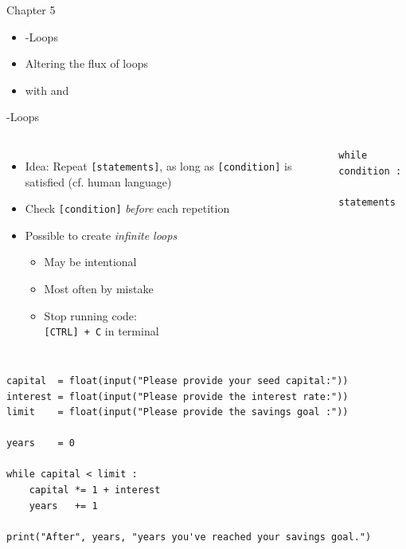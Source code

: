 
\begin{frame}[fragile]{Chapter 5}
%
\begin{itemize}
\item {}-Loops
\item Altering the flux of loops
\item {} with  and 
\end{itemize}
%
\end{frame}


\begin{frame}[fragile]{-Loops}
%
\begin{columns}[T]
\begin{itemize}
\item Idea: Repeat \texttt{[statements]}, as long as \texttt{[condition]} is satisfied (cf. human language)
\item Check \texttt{[condition]} \emph{before} each repetition
\item Possible to create \emph{infinite loops}
	\begin{itemize}
	\item May be intentional
	\item Most often by mistake
	\item Stop running code:\\
		\texttt{[CTRL] + C} in terminal
	\end{itemize}
\end{itemize}
%
\begin{codebox}
\begin{verbatim}
while condition :
    statements
\end{verbatim}
\end{codebox}
\end{columns}
%
\end{frame}


\begin{frame}[fragile]
%
\begin{codebox}
\begin{verbatim}
capital  = float(input("Please provide your seed capital:"))
interest = float(input("Please provide the interest rate:"))
limit    = float(input("Please provide the savings goal :"))

years    = 0

while capital < limit :
    capital *= 1 + interest
    years   += 1

print("After", years, "years you've reached your savings goal.")
\end{verbatim}
\end{codebox}
%
\end{frame}

